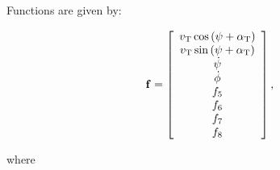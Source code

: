 \documentclass[sublist]{fei}
\begin{document}
Functions are given by:

\begin{equation} \label{functionNonlinear}
    {\bf f} = \left[ \begin{array}{c} v_{\rm T} \cos \left(\psi + \alpha_{\rm T} \right) \\ v_{\rm T} \sin \left(\psi + \alpha_{\rm T} \right) \\ \dot{\psi} \\ \dot{\phi} \\ f_5 \\ f_6 \\ f_7 \\ f_8 \\  \end{array} \right],
\end{equation}

where
\end{document}

